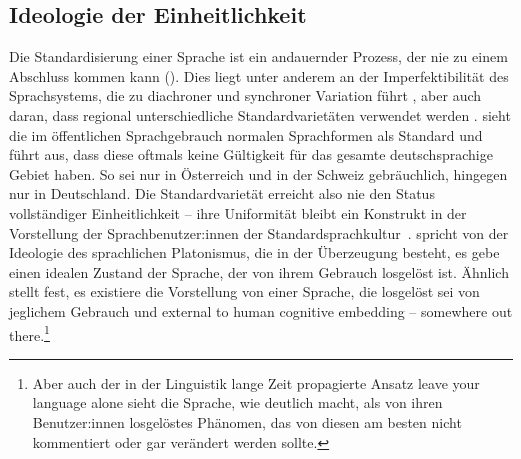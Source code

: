 \subsection{Ideologie der Einheitlichkeit}
\label{sec:Einheitlichkeit}
Die Standardisierung einer Sprache ist ein andauernder Prozess, der nie zu einem Abschluss kommen kann (\cites[s.][22]{Milroy1991}[534]{Milroy2001}). 
Dies liegt unter anderem an der Imperfektibilität des Sprachsystems, die zu diachroner und synchroner Variation führt \citep[s.][]{Antos2003}, aber auch daran, dass regional unterschiedliche Standardvarietäten verwendet werden \citep[s.][]{Ammon.2005}. \citet[29]{Ammon.2005} sieht \glqq die im öffentlichen Sprachgebrauch normalen Sprachformen\grqq{} als Standard und führt aus, dass diese oftmals keine Gültigkeit für das gesamte deutschsprachige Gebiet haben. 
So sei  nur in Österreich %
und in der Schweiz %
gebräuchlich,  hingegen nur in Deutschland. 
Die Standardvarietät erreicht also nie den Status vollst{\"a}ndiger Einheitlichkeit -- ihre Uniformit{\"a}t bleibt ein Konstrukt in der Vorstellung der Sprachbenutzer:innen der Standardsprachkultur~\citep[s.][134]{Milroy.2007}. 
\citet[17]{Maitz.2015} spricht von der Ideologie des sprachlichen Platonismus, die in der {\"U}berzeugung besteht, es gebe einen idealen Zustand der Sprache, der von ihrem Gebrauch losgel{\"o}st ist. 
Ähnlich stellt \citet[55]{Preston2004} fest, es existiere die Vorstellung von einer Sprache, die losgelöst sei von jeglichem Gebrauch und \glqq external to human cognitive embedding -- somewhere \glq out there\grq \grqq.\footnote{Aber auch der in der Linguistik lange Zeit propagierte Ansatz \glqq leave your language alone\grqq{} sieht die Sprache, wie \citet[4--5]{Cameron1995} deutlich macht, als von ihren Benutzer:innen losgelöstes Phänomen, das von diesen am besten nicht kommentiert oder gar verändert werden sollte.}

